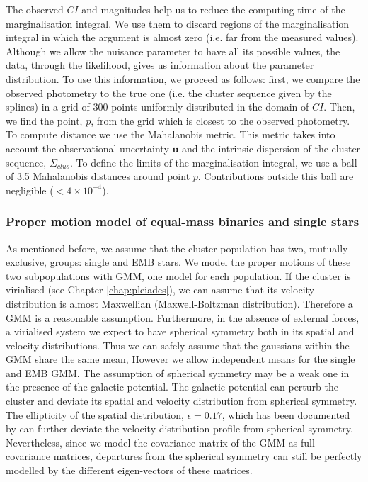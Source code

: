 The observed $CI$ and magnitudes help us  to reduce the computing time of the marginalisation integral. We use them to discard  regions of the marginalisation integral in which the argument is almost zero (i.e. far from the measured values). Although we allow the nuisance parameter to have all its possible values, the data, through the likelihood, gives us information about the parameter distribution. To use this information, we proceed as follows: first, we compare the observed photometry to the true one (i.e. the cluster sequence given by the splines) in a grid of 300 points uniformly distributed in the domain of $CI$. Then, we find the point, $p$, from the grid which is closest to the observed photometry. To compute distance we use the Mahalanobis metric. This metric takes into account the observational uncertainty $\mathbf{u}$ and the intrinsic dispersion of the cluster sequence, $\Sigma_{clus}$. To define the limits of the marginalisation integral, we use a ball of 3.5 Mahalanobis distances around point $p$. Contributions outside this ball are negligible ($< 4\times10^{-4}$).

\subsubsection{Proper motion model of equal-mass binaries and single stars}
As mentioned before, we assume that the cluster population has two, mutually exclusive, groups: single and EMB stars.
We model the proper motions of these two subpopulations with GMM, one model for each population. If the cluster is virialised (see Chapter \ref{chap:pleiades}), we can assume that its velocity distribution is almost Maxwellian (Maxwell-Boltzman distribution). Therefore a GMM is a reasonable assumption. Furthermore, in the absence of external forces, a virialised system we expect to have spherical symmetry both in its spatial and velocity distributions. Thus we can safely assume that the gaussians within the GMM share the same mean, However we allow independent means for the single and EMB GMM. The assumption of spherical symmetry may be a weak one in the presence of the galactic potential. The galactic potential can perturb the cluster and deviate its spatial and velocity distribution from spherical symmetry. The ellipticity of the spatial distribution, $\epsilon=0.17$, which has been documented by \citet{Raboud1998} can further deviate the velocity distribution profile from spherical symmetry. Nevertheless, since we model the covariance matrix of the GMM as full covariance matrices, departures from the spherical symmetry can still be perfectly modelled by the different eigen-vectors of these matrices.


